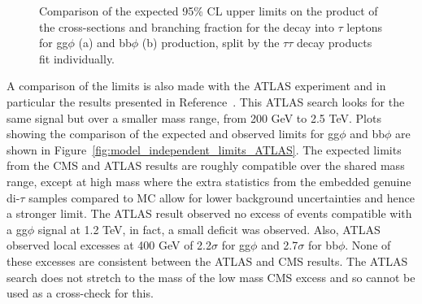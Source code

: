 \begin{figure}[!hbtp]
\centering
\caption{Comparison of the expected 95\% CL upper limits on the product of the cross-sections and branching fraction for the decay into $\tau$ leptons for gg$\phi$ (a) and bb$\phi$ (b) production, split by the $\tau\tau$ decay products fit individually.}
\label{fig:model_independent_limits_by_channel}
\end{figure}

A comparison of the limits is also made with the ATLAS experiment and in particular the results presented in Reference~\cite{ATLAS:2020zms}.
This ATLAS search looks for the same signal but over a smaller mass range, from 200 GeV to 2.5 TeV.
Plots showing the comparison of the expected and observed limits for gg$\phi$ and bb$\phi$ are shown in Figure~\ref{fig:model_independent_limits_ATLAS}.
The expected limits from the \ac{CMS} and ATLAS results are roughly compatible over the shared mass range, except at high mass where the extra statistics from the embedded genuine di-$\tau$ samples compared to \ac{MC} allow for lower background uncertainties and hence a stronger limit.
The ATLAS result observed no excess of events compatible with a gg$\phi$ signal at 1.2 TeV, in fact, a small deficit was observed.
Also, ATLAS observed local excesses at 400 GeV of 2.2$\sigma$ for gg$\phi$ and 2.7$\sigma$ for bb$\phi$.
None of these excesses are consistent between the ATLAS and \ac{CMS} results.
The ATLAS search does not stretch to the mass of the low mass \ac{CMS} excess and so cannot be used as a cross-check for this.


